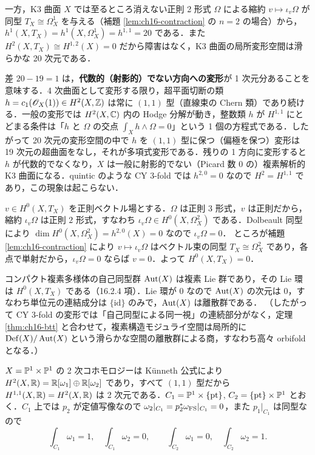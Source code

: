 一方，K3 曲面 $X$ では至るところ消えない正則 2 形式 $\Omega$ による縮約 $v\mapsto\iota_v\Omega$ が同型 $T_X\cong\Omega^1_X$ を与える（補題 \ref{lem:ch16-contraction} の $n=2$ の場合）から，$h^1(X,T_X)=h^1(X,\Omega^1_X)=h^{1,1}=20$ である．また $H^2(X,T_X)\cong H^{1,2}(X)=0$ だから障害はなく，K3 曲面の局所変形空間は滑らかな 20 次元である．

差 $20-19=1$ は，\textbf{代数的（射影的）でない方向への変形}が 1 次元分あることを意味する．4 次曲面として変形する限り，超平面切断の類 $h=c_1(\mathscr{O}_X(1))\in H^2(X,\mathbb{Z})$ は常に $(1,1)$ 型（直線束の Chern 類）であり続ける．一般の変形では $H^2(X,\mathbb{C})$ 内の Hodge 分解が動き，整数類 $h$ が $H^{1,1}$ にとどまる条件は「$h$ と $\Omega$ の交点 $\int_X h\wedge\Omega=0$」という 1 個の方程式である．したがって 20 次元の変形空間の中で $h$ を $(1,1)$ 型に保つ（偏極を保つ）変形は 19 次元の超曲面をなし，それが多項式変形である．残りの 1 方向に変形すると $h$ が代数的でなくなり，$X$ は一般に射影的でない（Picard 数 $0$ の）複素解析的 K3 曲面になる．quintic のような CY 3-fold では $h^{2,0}=0$ なので $H^2=H^{1,1}$ であり，この現象は起こらない．

$v\in H^0(X,T_X)$ を正則ベクトル場とする．$\Omega$ は正則 $3$ 形式，$v$ は正則だから，縮約 $\iota_v\Omega$ は正則 $2$ 形式，すなわち $\iota_v\Omega\in H^0(X,\Omega^2_X)$ である．Dolbeault 同型により $\dim H^0(X,\Omega^2_X)=h^{2,0}(X)=0$ なので $\iota_v\Omega=0$．
ところが補題 \ref{lem:ch16-contraction} により $v\mapsto\iota_v\Omega$ はベクトル束の同型 $T_X\cong\Omega^2_X$ であり，各点で単射だから，$\iota_v\Omega=0$ ならば $v=0$．よって $H^0(X,T_X)=0$．

コンパクト複素多様体の自己同型群 $\operatorname{Aut}(X)$ は複素 Lie 群であり，その Lie 環は $H^0(X,T_X)$ である（16.2.4 項）．Lie 環が $0$ なので $\operatorname{Aut}(X)$ の次元は $0$，すなわち単位元の連結成分は $\{\mathrm{id}\}$ のみで，$\operatorname{Aut}(X)$ は離散群である．
（したがって CY 3-fold の変形では「自己同型による同一視」の連続部分がなく，定理 \ref{thm:ch16-btt} と合わせて，複素構造モジュライ空間は局所的に $\mathrm{Def}(X)/\operatorname{Aut}(X)$ という滑らかな空間の離散群による商，すなわち高々 orbifold となる．）

$X=\mathbb{P}^1\times\mathbb{P}^1$ の 2 次コホモロジーは K\"unneth 公式により $H^2(X,\mathbb{R})=\mathbb{R}[\omega_1]\oplus\mathbb{R}[\omega_2]$ であり，すべて $(1,1)$ 型だから $H^{1,1}(X,\mathbb{R})=H^2(X,\mathbb{R})$ は 2 次元である．$C_1=\mathbb{P}^1\times\{\mathrm{pt}\}$, $C_2=\{\mathrm{pt}\}\times\mathbb{P}^1$ とおく．$C_1$ 上では $p_2$ が定値写像なので $\omega_2|_{C_1}=p_2^*\omega_{\rm FS}|_{C_1}=0$，また $p_1|_{C_1}$ は同型なので
\[
\int_{C_1}\omega_1=1,\quad \int_{C_1}\omega_2=0,\qquad \int_{C_2}\omega_1=0,\quad \int_{C_2}\omega_2=1 .
\]

